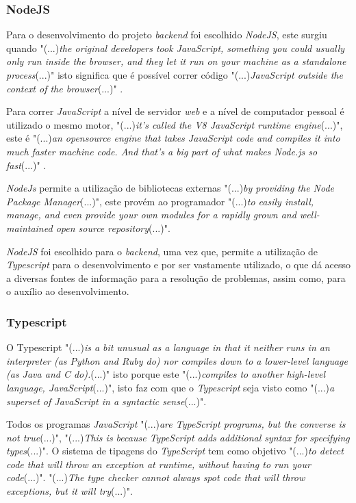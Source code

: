 \newpage

\subsubsection{NodeJS}

Para o desenvolvimento do projeto \emph{backend} foi escolhido \textit{NodeJS}, este surgiu quando "(...)\emph{the original developers took JavaScript, something you could usually only run inside the browser, and they let it run on your machine as a standalone process}(...)"\citep{design_node} isto significa que é possível correr código "(...)\emph{JavaScript outside the context of the browser}(...)"\citep{design_node} .

Para correr \textit{JavaScript} a nível de servidor \emph{web} e a nível de computador pessoal é utilizado o mesmo motor, "(...)\emph{it's called the V8 JavaScript runtime engine}(...)"\citep{design_node}, este é "(...)\emph{an opensource engine that takes JavaScript code and compiles it into much faster machine code. And that's a big part of what makes Node.js so fast}(...)"\citep{design_node} .

\textit{NodeJs} permite a utilização de bibliotecas externas "(...)\emph{by providing the Node Package Manager}(...)"\citep{design_node}, este provém ao programador "(...)\emph{to easily install, manage, and even provide your own modules for a rapidly grown and well-maintained open source repository}(...)"\citep{design_node}.

\textit{NodeJS} foi escolhido para o \textit{backend}, uma vez que, permite a utilização de \textit{Typescript} para o desenvolvimento e por ser vastamente utilizado, o que dá acesso a diversas fontes de informação para a resolução de problemas, assim como, para o auxílio ao desenvolvimento.


\subsubsection{Typescript}
O Typescript "(...)\emph{is a bit unusual as a language in that it neither runs in an interpreter (as Python and Ruby do) nor compiles down to a lower-level language (as Java and C do).}(...)"\citep{typescript} isto porque este "(...)\emph{compiles to another high-level language, JavaScript}(...)"\citep{typescript}, isto faz com que o \emph{Typescript} seja visto como "(...)\emph{a superset of JavaScript in a syntactic sense}(...)"\citep{typescript}.

Todos os programas \emph{JavaScript} "(...)\emph{are TypeScript programs, but the converse is not true}(...)"\citep{typescript}, "(...)\emph{This is because TypeScript adds additional syntax for specifying types}(...)"\citep{typescript}. O sistema de tipagens do \emph{TypeScript} tem como objetivo "(...)\emph{to detect code that will throw an exception at runtime, without having to run your code}(...)"\citep{typescript}. "(...)\emph{The type checker cannot always spot code that will throw exceptions, but it will try}(...)"\citep{typescript}.

